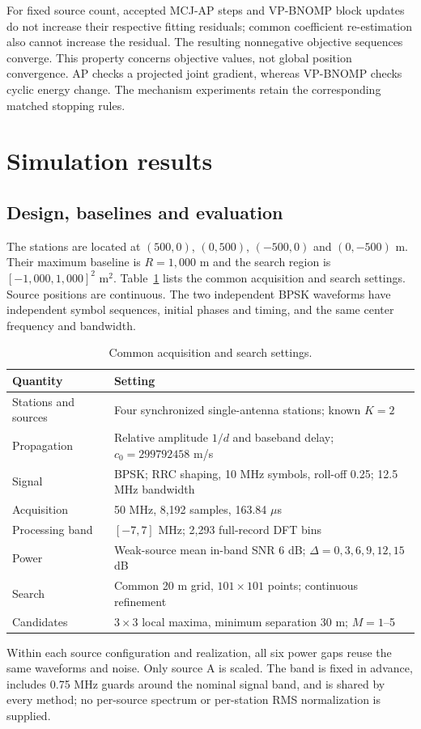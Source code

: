 \documentclass[a4paper,fleqn,review]{cas-sc}
\begin{document}
For fixed source count, accepted MCJ-AP steps and VP-BNOMP block updates do not increase their respective fitting residuals; common coefficient re-estimation also cannot increase the residual. The resulting nonnegative objective sequences converge. This property concerns objective values, not global position convergence. AP checks a projected joint gradient, whereas VP-BNOMP checks cyclic energy change. The mechanism experiments retain the corresponding matched stopping rules.

\FloatBarrier
\section{Simulation results}
\FloatBarrier
\subsection{Design, baselines and evaluation}
The stations are located at $(500,0)$, $(0,500)$, $(-500,0)$ and $(0,-500)$ m. Their maximum baseline is $R=1,000$ m and the search region is $[-1,000,1,000]^2$ m$^2$. Table~\ref{en:settings} lists the common acquisition and search settings. Source positions are continuous. The two independent BPSK waveforms have independent symbol sequences, initial phases and timing, and the same center frequency and bandwidth.
\begin{table}[pos=H]\centering\small
\caption{Common acquisition and search settings.}\label{en:settings}
\begin{tabularx}{\linewidth}{@{}lX@{}}\toprule
Quantity & Setting\\\midrule
Stations and sources & Four synchronized single-antenna stations; known $K=2$\\
Propagation & Relative amplitude $1/d$ and baseband delay; $c_0=299792458$ m/s\\
Signal & BPSK; RRC shaping, 10 MHz symbols, roll-off 0.25; 12.5 MHz bandwidth\\
Acquisition & 50 MHz, 8,192 samples, 163.84 $\mu$s\\
Processing band & $[-7,7]$ MHz; 2,293 full-record DFT bins\\
Power & Weak-source mean in-band SNR 6 dB; $\Delta=0,3,6,9,12,15$ dB\\
Search & Common 20 m grid, $101\times101$ points; continuous refinement\\
Candidates & $3\times3$ local maxima, minimum separation 30 m; $M=1$--5\\\bottomrule
\end{tabularx}\end{table}
Within each source configuration and realization, all six power gaps reuse the same waveforms and noise. Only source A is scaled. The band is fixed in advance, includes 0.75 MHz guards around the nominal signal band, and is shared by every method; no per-source spectrum or per-station RMS normalization is supplied.
\end{document}
